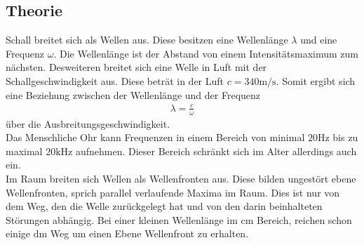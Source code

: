 \documentclass[12pt,a4paper,titlepage,headinclude]{scrartcl}
\numberwithin{equation}{subsection}
\begin{document}
\subsection{Theorie}
\label{sec:theo}
Schall breitet sich als Wellen aus.
Diese besitzen eine Wellenlänge $\lambda$ und eine Frequenz $\omega$.
Die Wellenlänge ist der Abstand von einem Intensitätsmaximum zum nächsten.
Desweiteren breitet sich eine Welle in Luft mit der Schallgeschwindigkeit aus.
Diese beträt in der Luft $c=340\si{\meter\per\second}$.
Somit ergibt sich eine Beziehung zwischen der Wellenlänge und der Frequenz
\begin{align}
	\lambda=\frac{c}{\omega}\label{eq:lw}
\end{align}
über die Ausbreitungsgeschwindigkeit.\\
Das Menschliche Ohr kann Frequenzen in einem Bereich von minimal $20\si{\hertz}$ bis zu maximal $20\si{\kilo\hertz}$ aufnehmen.
Dieser Bereich schränkt sich im Alter allerdings auch ein.\\
Im Raum breiten sich Wellen als Wellenfronten aus.
Diese bilden ungestört ebene Wellenfronten, sprich parallel verlaufende Maxima im Raum.
Dies ist nur von dem Weg, den die Welle zurückgelegt hat und von den darin beinhalteten Störungen abhängig.
Bei einer kleinen Wellenlänge im $\si{\centi\meter}$ Bereich, reichen schon einige $\si{\deci\meter}$ Weg um einen Ebene Wellenfront zu erhalten.
\end{document}
